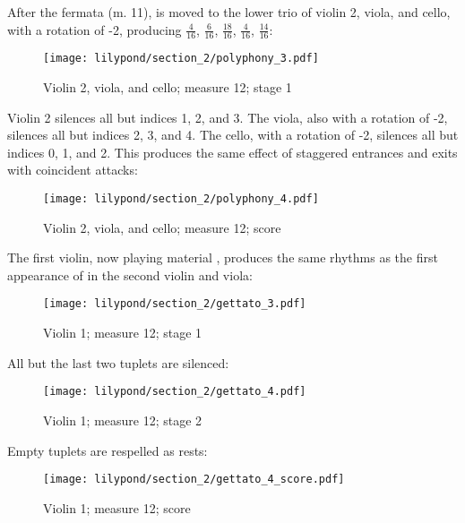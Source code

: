 After the fermata (m. 11),  is moved to the lower trio of violin 2, viola, and cello, with a rotation of -2, producing $\frac{4}{16}$, $\frac{6}{16}$, $\frac{18}{16}$, $\frac{4}{16}$, $\frac{14}{16}$:

\setcounter{figure}{9}
\setcounter{subFigure}{1}
\begin{figure}[H]
    \texttt{[image: lilypond/section\_2/polyphony\_3.pdf]}
    \caption{Violin 2, viola, and cello; measure 12; stage 1}
    \label{fig:polyphony-talea-3}
\end{figure}

Violin 2 silences all but indices 1, 2, and 3. The viola, also with a rotation of -2, silences all but indices 2, 3, and 4. The cello, with a rotation of -2, silences all but indices 0, 1, and 2. This produces the same effect of staggered entrances and exits with coincident attacks:

\setcounter{figure}{9}
\setcounter{subFigure}{2}
\begin{figure}[H]
    \texttt{[image: lilypond/section\_2/polyphony\_4.pdf]}
    \caption{Violin 2, viola, and cello; measure 12; score}
    \label{fig:polyphony-talea-4}
\end{figure}

The first violin, now playing material , produces the same rhythms as the first appearance of  in the second violin and viola:

\setcounter{figure}{10}
\setcounter{subFigure}{1}
\begin{figure}[H]
    \texttt{[image: lilypond/section\_2/gettato\_3.pdf]}
    \caption{Violin 1; measure 12; stage 1}
    \label{fig:gettato-v1-1}
\end{figure}

All but the last two tuplets are silenced:

\setcounter{figure}{10}
\setcounter{subFigure}{2}
\begin{figure}[H]
    \texttt{[image: lilypond/section\_2/gettato\_4.pdf]}
    \caption{Violin 1; measure 12; stage 2}
    \label{fig:gettato-v1-4}
\end{figure}

Empty tuplets are respelled as rests:

\setcounter{figure}{10}
\setcounter{subFigure}{3}
\begin{figure}[H]
    \texttt{[image: lilypond/section\_2/gettato\_4\_score.pdf]}
    \caption{Violin 1; measure 12; score}
    \label{fig:gettato-v1-4-score}
\end{figure}

